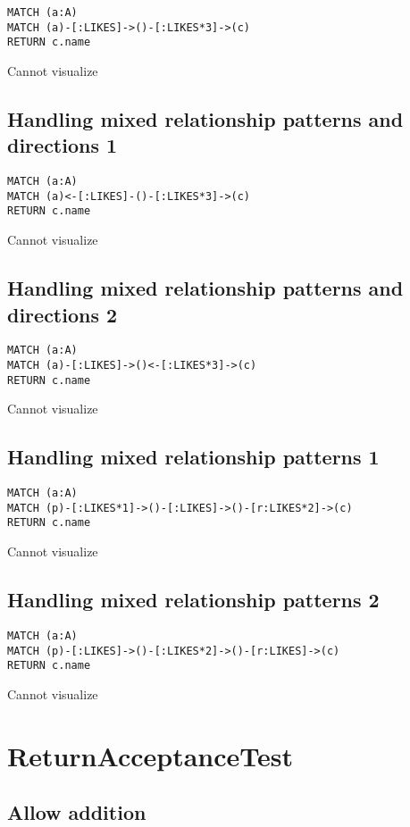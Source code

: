 \begin{lstlisting}
MATCH (a:A)
MATCH (a)-[:LIKES]->()-[:LIKES*3]->(c)
RETURN c.name
\end{lstlisting}

Cannot visualize
\subsection{Handling mixed relationship patterns and directions 1}

\begin{lstlisting}
MATCH (a:A)
MATCH (a)<-[:LIKES]-()-[:LIKES*3]->(c)
RETURN c.name
\end{lstlisting}

Cannot visualize
\subsection{Handling mixed relationship patterns and directions 2}

\begin{lstlisting}
MATCH (a:A)
MATCH (a)-[:LIKES]->()<-[:LIKES*3]->(c)
RETURN c.name
\end{lstlisting}

Cannot visualize
\subsection{Handling mixed relationship patterns 1}

\begin{lstlisting}
MATCH (a:A)
MATCH (p)-[:LIKES*1]->()-[:LIKES]->()-[r:LIKES*2]->(c)
RETURN c.name
\end{lstlisting}

Cannot visualize
\subsection{Handling mixed relationship patterns 2}

\begin{lstlisting}
MATCH (a:A)
MATCH (p)-[:LIKES]->()-[:LIKES*2]->()-[r:LIKES]->(c)
RETURN c.name
\end{lstlisting}

Cannot visualize
\section{ReturnAcceptanceTest}

\subsection{Allow addition}

